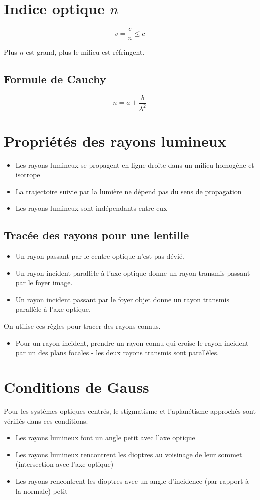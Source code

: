 \documentclass[openany]{book}
\begin{document}
\section{Indice optique $ n $}
\[ v = \frac{c}{n} \leq c \]

Plus $ n $ est grand, plus le milieu est réfringent. 

\subsection{Formule de Cauchy}
\[ n = a + \frac{b}{\lambda^2} \]

\section{Propriétés des rayons lumineux}
\begin{itemize}
    \item Les rayons lumineux se propagent en ligne droite dans un milieu homogène et isotrope
    \item La trajectoire suivie par la lumière ne dépend pas du sens de propagation
    \item Les rayons lumineux sont indépendants entre eux
\end{itemize}

\subsection{Tracée des rayons pour une lentille}
\begin{itemize}
    \item Un rayon passant par le centre optique n'est pas dévié.
    \item Un rayon incident parallèle à l'axe optique donne un rayon transmis passant par le foyer image. 
    \item Un rayon incident passant par le foyer objet donne un rayon transmis parallèle à l'axe optique. 
\end{itemize}
On utilise ces règles pour tracer des rayons connus.
\begin{itemize}
    \item Pour un rayon incident, prendre un rayon connu qui croise le rayon incident par un des plans focales - les deux rayons transmis sont parallèles. 
\end{itemize}

\section{Conditions de Gauss}
Pour les systèmes optiques centrés, le stigmatisme et l'aplanétisme approchés sont vérifiés dans ces conditions.
\begin{itemize}
    \item Les rayons lumineux font un angle petit avec l'axe optique
    \item Les rayons lumineux rencontrent les dioptres au voisinage de leur sommet (intersection avec l'axe optique)
    \item Les rayons rencontrent les dioptres avec un angle d'incidence (par rapport à la normale) petit
\end{itemize}
\end{document}
